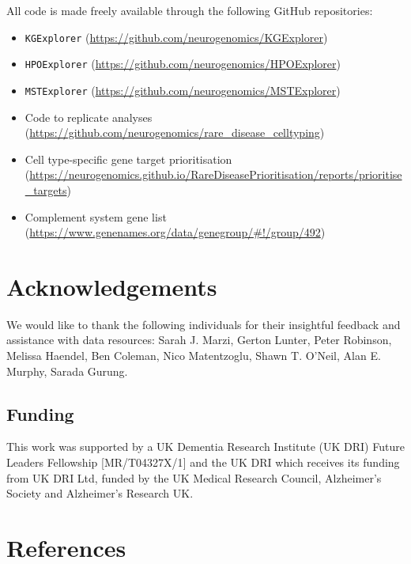 \documentclass[
]{report}
\providecommand{\tightlist}{%
  \setlength{\itemsep}{0pt}\setlength{\parskip}{0pt}}\usepackage{longtable,booktabs,array}
\begin{document}
All code is made freely available through the following GitHub
repositories:

\begin{itemize}
\tightlist
\item
  \texttt{KGExplorer}
  (\url{https://github.com/neurogenomics/KGExplorer})
\item
  \texttt{HPOExplorer}
  (\url{https://github.com/neurogenomics/HPOExplorer})
\item
  \texttt{MSTExplorer}
  (\url{https://github.com/neurogenomics/MSTExplorer})
\item
  Code to replicate analyses
  (\url{https://github.com/neurogenomics/rare_disease_celltyping})
\item
  Cell type-specific gene target prioritisation
  (\url{https://neurogenomics.github.io/RareDiseasePrioritisation/reports/prioritise_targets})
\item
  Complement system gene list
  (\url{https://www.genenames.org/data/genegroup/\#!/group/492})
\end{itemize}

\section{Acknowledgements}\label{acknowledgements}

We would like to thank the following individuals for their insightful
feedback and assistance with data resources: Sarah J. Marzi, Gerton
Lunter, Peter Robinson, Melissa Haendel, Ben Coleman, Nico Matentzoglu,
Shawn T. O'Neil, Alan E. Murphy, Sarada Gurung.

\subsection{Funding}\label{funding}

This work was supported by a UK Dementia Research Institute (UK DRI)
Future Leaders Fellowship {[}MR/T04327X/1{]} and the UK DRI which
receives its funding from UK DRI Ltd, funded by the UK Medical Research
Council, Alzheimer's Society and Alzheimer's Research UK.

\section*{References}\label{references}
\end{document}
